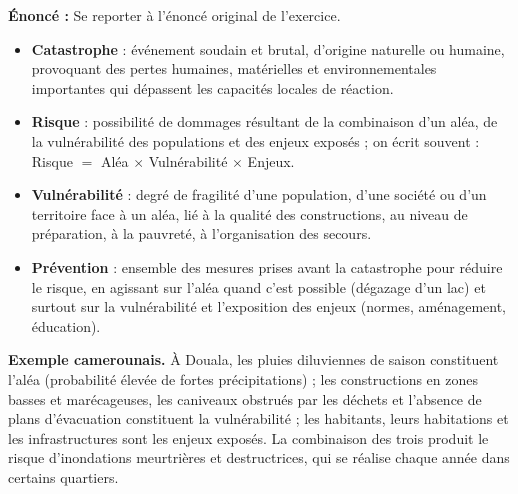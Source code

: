 \documentclass[11pt]{article}
\newcommand{\cle}[1]{{\popxbold\color{popdark}#1}}
\begin{document}
\begin{corrige}
\textbf{Énoncé :} Se reporter à l'énoncé original de l'exercice.
\tcblower
\begin{itemize}
\item \textbf{Catastrophe} : événement soudain et brutal, d'origine naturelle ou humaine, provoquant des pertes humaines, matérielles et environnementales importantes qui dépassent les capacités locales de réaction.
\item \textbf{Risque} : possibilité de dommages résultant de la combinaison d'un aléa, de la vulnérabilité des populations et des enjeux exposés ; on écrit souvent : Risque $=$ Aléa $\times$ Vulnérabilité $\times$ Enjeux.
\item \textbf{Vulnérabilité} : degré de fragilité d'une population, d'une société ou d'un territoire face à un aléa, lié à la qualité des constructions, au niveau de préparation, à la pauvreté, à l'organisation des secours.
\item \textbf{Prévention} : ensemble des mesures prises avant la catastrophe pour réduire le risque, en agissant sur l'aléa quand c'est possible (dégazage d'un lac) et surtout sur la vulnérabilité et l'exposition des enjeux (normes, aménagement, éducation).
\end{itemize}

\textbf{Exemple camerounais.} À Douala, les pluies diluviennes de saison constituent l'\cle{aléa} (probabilité élevée de fortes précipitations) ; les constructions en zones basses et marécageuses, les caniveaux obstrués par les déchets et l'absence de plans d'évacuation constituent la \cle{vulnérabilité} ; les habitants, leurs habitations et les infrastructures sont les \cle{enjeux} exposés. La combinaison des trois produit le \cle{risque} d'inondations meurtrières et destructrices, qui se réalise chaque année dans certains quartiers.
\end{corrige}
\end{document}
